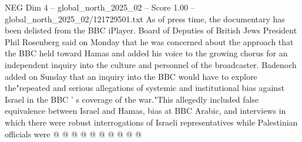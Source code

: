 \begin{textsample}{NEG Dim 4 – global\_north\_2025\_02 – Score 1.00 – global\_north\_2025\_02/121729501.txt}
As of press time, the documentary has been delisted from the BBC iPlayer.
Board of Deputies of British Jews President Phil Rosenberg said on Monday that he was concerned about the approach that the BBC held toward Hamas and added his voice to the growing chorus for an independent inquiry into the culture and personnel of the broadcaster.
Badenoch added on Sunday that an inquiry into the BBC would have to explore the"repeated and serious allegations of systemic and institutional bias against Israel in the BBC ' s coverage of the war."This allegedly included false equivalence between Israel and Hamas, bias at BBC Arabic, and interviews in which there were robust interrogations of Israeli representatives while Palestinian officials were @ @ @ @ @ @ @ @ @ @

\end{textsample}
